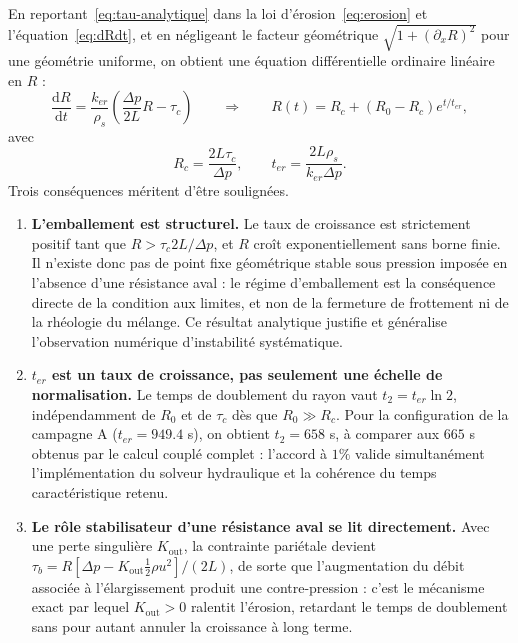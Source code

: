 \documentclass[11pt,a4paper]{report}
\newcommand{\kout}{K_{\mathrm{out}}}
\newcommand{\ter}{{t_{er}}}
\begin{document}
En reportant~\eqref{eq:tau-analytique} dans la loi d'érosion~\eqref{eq:erosion} et
l'équation~\eqref{eq:dRdt}, et en négligeant le facteur géométrique \(\sqrt{1+(\partial_xR)^2}\) pour une
géométrie uniforme, on obtient une équation différentielle ordinaire linéaire en \(R\) :
\begin{equation}
\frac{\mathrm{d}R}{\mathrm{d}t}
= \frac{k_{er}}{\rho_s}\left(\frac{\Delta p}{2L}R - \tau_c\right)
\qquad\Longrightarrow\qquad
R(t) = R_c + \left(R_0 - R_c\right)e^{t/\ter},
\label{eq:R-exponentielle}
\end{equation}
avec
\begin{equation}
R_c = \frac{2L\tau_c}{\Delta p},
\qquad
\ter = \frac{2L\rho_s}{k_{er}\Delta p}.
\label{eq:Rc-ter}
\end{equation}
Trois conséquences méritent d'être soulignées.

\begin{enumerate}
  \item \textbf{L'emballement est structurel.} Le taux de croissance est strictement positif tant que
        \(R>\tau_c 2L/\Delta p\), et \(R\) croît exponentiellement sans borne finie. Il n'existe donc pas
        de point fixe géométrique stable sous pression imposée en l'absence d'une résistance aval : le
        régime d'emballement est la conséquence directe de la condition aux limites, et non de la
        fermeture de frottement ni de la rhéologie du mélange. Ce résultat analytique justifie et
        généralise l'observation numérique d'instabilité systématique.
  \item \textbf{\(\ter\) est un taux de croissance, pas seulement une échelle de normalisation.} Le temps
        de doublement du rayon vaut \(t_2 = \ter\ln 2\), indépendamment de \(R_0\) et de \(\tau_c\) dès
        que \(R_0 \gg R_c\). Pour la configuration de la campagne A (\(\ter = 949.4\) s), on obtient
        \(t_2 = 658\) s, à comparer aux \(665\) s obtenus par le calcul couplé complet : l'accord à
        \(1\%\) valide simultanément l'implémentation du solveur hydraulique et la cohérence du temps
        caractéristique retenu.
  \item \textbf{Le rôle stabilisateur d'une résistance aval se lit directement.} Avec une perte singulière
        \(\kout\), la contrainte pariétale devient \(\tau_b = R\left[\Delta p - \kout\frac{1}{2}\rho u^2\right]/(2L)\),
        de sorte que l'augmentation du débit associée à l'élargissement produit une contre-pression :
        c'est le mécanisme exact par lequel \(\kout>0\) ralentit l'érosion, retardant le temps de
        doublement sans pour autant annuler la croissance à long terme.
\end{enumerate}
\end{document}
